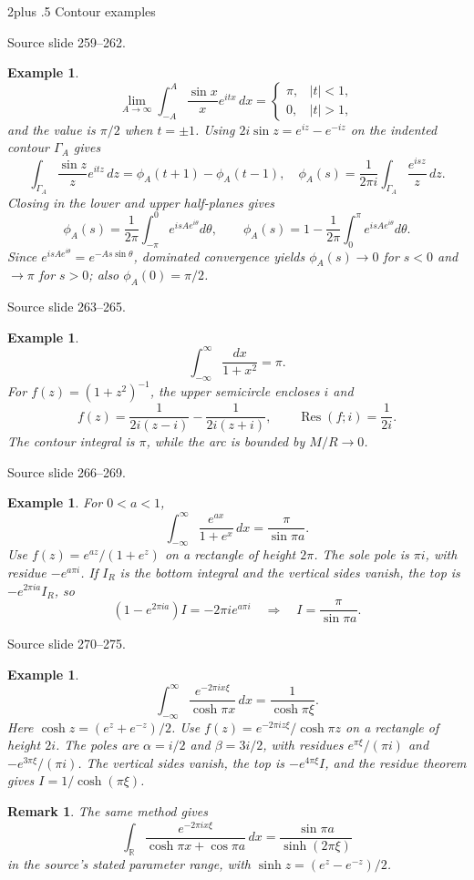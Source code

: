 \documentclass[10pt,letterpaper,twoside,openright]{amsbook}
\makeatletter
\numberwithin{equation}{subsection}
\renewcommand{\section}{\@startsection{section}{1}
 {\z@}{2\baselineskip plus .5\baselineskip}
 {\baselineskip}{\normalfont\Large\bfseries\centering}}
\theoremstyle{sea-plain}
\theoremstyle{sea-definition}
\newtheorem{example}[subsection]{Example}
\newtheorem{remark}[subsection]{Remark}
\theoremstyle{sea-exercise}
\DeclareMathOperator{\Res}{Res}
\newcommand{\RR}{\mathbb{R}}
\newcommand{\src}[1]{\par\smallskip\noindent
 {\scriptsize\sffamily\color{SoftWhite}Source slide #1.}\par\nopagebreak\smallskip}
\makeatother
\begin{document}
\section{Contour examples}
\src{259--262}
\begin{example}
\[
\lim_{A\to\infty}\int_{-A}^{A}\frac{\sin x}{x}e^{itx}\,dx
=\begin{cases}\pi,&|t|<1,\\0,&|t|>1,\end{cases}
\]
and the value is $\pi/2$ when $t=\pm1$. Using
$2i\sin z=e^{iz}-e^{-iz}$ on the indented contour $\Gamma_A$ gives
\[
\int_{\Gamma_A}\frac{\sin z}{z}e^{itz}\,dz
=\phi_A(t+1)-\phi_A(t-1),
\quad
\phi_A(s)=\frac1{2\pi i}\int_{\Gamma_A}\frac{e^{isz}}z\,dz.
\]
Closing in the lower and upper half-planes gives
\[
\phi_A(s)=\frac1{2\pi}\int_{-\pi}^0e^{isAe^{i\theta}}d\theta,
\qquad
\phi_A(s)=1-\frac1{2\pi}\int_0^\pi e^{isAe^{i\theta}}d\theta.
\]
Since $e^{isAe^{i\theta}}=e^{-As\sin\theta}$, dominated convergence yields
$\phi_A(s)\to0$ for $s<0$ and $\to\pi$ for $s>0$; also
$\phi_A(0)=\pi/2$.
\end{example}
\src{263--265}
\begin{example}
\[
\int_{-\infty}^{\infty}\frac{dx}{1+x^2}=\pi.
\]
For $f(z)=(1+z^2)^{-1}$, the upper semicircle encloses $i$ and
\[
f(z)=\frac1{2i(z-i)}-\frac1{2i(z+i)},\qquad \Res(f;i)=\frac1{2i}.
\]
The contour integral is $\pi$, while the arc is bounded by $M/R\to0$.
\end{example}
\src{266--269}
\begin{example}
For $0<a<1$,
\[
\int_{-\infty}^{\infty}\frac{e^{ax}}{1+e^x}\,dx=\frac{\pi}{\sin\pi a}.
\]
Use $f(z)=e^{az}/(1+e^z)$ on a rectangle of height $2\pi$.
The sole pole is $\pi i$, with residue $-e^{a\pi i}$. If $I_R$ is
the bottom integral and the vertical sides vanish, the top is
$-e^{2\pi ia}I_R$, so
\[
(1-e^{2\pi ia})I=-2\pi i e^{a\pi i}
\quad\Longrightarrow\quad I=\frac{\pi}{\sin\pi a}.
\]
\end{example}
\src{270--275}
\begin{example}
\[
\int_{-\infty}^{\infty}\frac{e^{-2\pi ix\xi}}{\cosh\pi x}\,dx
=\frac1{\cosh\pi\xi}.
\]
Here $\cosh z=(e^z+e^{-z})/2$.
Use $f(z)=e^{-2\pi iz\xi}/\cosh\pi z$ on a rectangle of height $2i$.
The poles are $\alpha=i/2$ and $\beta=3i/2$, with residues
$e^{\pi\xi}/(\pi i)$ and $-e^{3\pi\xi}/(\pi i)$. The vertical sides
vanish, the top is $-e^{4\pi\xi}I$, and the residue theorem gives
$I=1/\cosh(\pi\xi)$.
\end{example}
\begin{remark}
The same method gives
\[
\int_\RR\frac{e^{-2\pi ix\xi}}{\cosh\pi x+\cos\pi a}\,dx
=\frac{\sin\pi a}{\sinh(2\pi\xi)}
\]
in the source's stated parameter range, with
$\sinh z=(e^z-e^{-z})/2$.
\end{remark}
\end{document}
